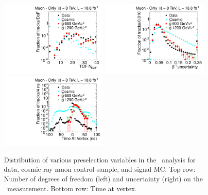 \begin{figure}
\centering
  \includegraphics[clip=false, trim=0.0cm 0cm 0.0cm 0cm, width=0.48\textwidth]{figures/muonly/Selection_Comp_8TeV_Cosmic_nDof_BS}
  \includegraphics[clip=false, trim=0.0cm 0cm 0.0cm 0cm, width=0.48\textwidth]{figures/muonly/Selection_Comp_8TeV_Cosmic_TOFError_BS} \\
  \includegraphics[clip=false, trim=0.0cm 0cm 0.0cm 0cm, width=0.48\textwidth]{figures/muonly/Selection_Comp_8TeV_Cosmic_TimeAtIP_BS} \\
\caption[Distribution of number of degrees of freedom (left) and uncertainty (right) on the \invbeta\ measurement and time at vertex in 
the \muononly\ analysis for data, cosmic-ray muon control sample, and signal MC.]
{Distribution of various preselection variables in the \muononly\ analysis for data, cosmic-ray muon control sample, and signal MC.
Top row: Number of degrees of freedom (left) and uncertainty (right) on the \invbeta\ measurement.
Bottom row: Time at vertex.}
    \label{fig:MuOnlyPreselB}
\end{figure}

